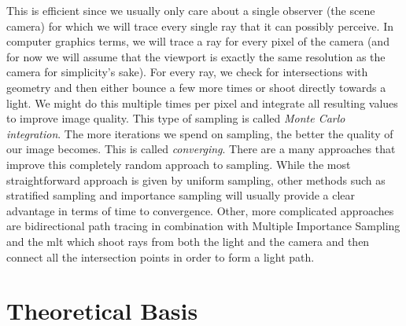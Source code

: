 \documentclass[
  twoside,
  11pt, a4paper,
  footinclude=true,
  headinclude=true,
  cleardoublepage=empty
]{scrreprt}
\begin{document}
This is efficient since we usually only care about a
single observer (the scene camera) for which we will trace every single ray that it can possibly
perceive. In computer graphics terms, we will trace a ray for every pixel of the camera (and for
now we will assume that the viewport is exactly the same resolution as the camera for simplicity's
sake). For every ray, we check for intersections with geometry and then either bounce a few more
times or shoot directly towards a light. We might do this multiple times per pixel and integrate
all resulting values to improve image
quality. This type of sampling is called \emph{Monte Carlo integration}.
The more iterations we spend on sampling, the better the
quality of our image becomes. This is called \emph{converging}.
There are a many approaches that improve this completely random approach to sampling. While the
most straightforward approach is given by uniform sampling, other methods such as stratified
sampling \cite{veach1997robust} and importance sampling \cite{veach1997robust} will usually provide
a clear advantage in terms of time to
convergence. Other, more complicated approaches are bidirectional path tracing
\cite{techreport:pbr} in combination with Multiple Importance Sampling \cite{veach1997robust}
and the \ac{mlt} \cite{inproceedings:metropolis} which shoot rays from both
the light and the camera and then connect all the intersection points in order to form a light
path.

\section{Theoretical Basis}
\end{document}
